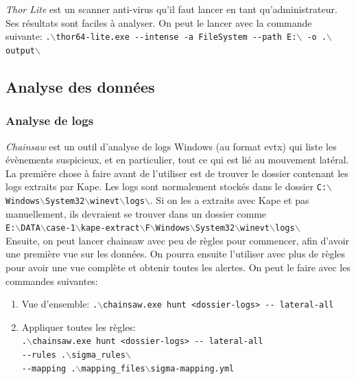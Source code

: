 \textit{Thor Lite} est un scanner anti-virus qu'il faut lancer en tant qu'administrateur. Ses résultats sont faciles à analyser. On peut le lancer avec la commande suivante: \texttt{.$\backslash$thor64-lite.exe -{}-intense -a FileSystem -{}-path E:$\backslash$ -o .$\backslash$output$\backslash$}





\subsection{Analyse des données}



\subsubsection{Analyse de logs}

\textit{Chainsaw} est un outil d'analyse de logs Windows (au format evtx) qui liste les évènements suspicieux, et en particulier, tout ce qui est lié au mouvement latéral. La première chose à faire avant de l'utiliser est de trouver le dossier contenant les logs extraits par Kape. Les logs sont normalement stockés dans le dossier \texttt{C:$\backslash$Windows$\backslash$System32$\backslash$winevt$\backslash$logs$\backslash$}. Si on les a extraits avec Kape et pas manuellement, ils devraient se trouver dans un dossier comme \\
\texttt{E:$\backslash$DATA$\backslash$case-1$\backslash$kape-extract$\backslash$F$\backslash$Windows$\backslash$System32$\backslash$winevt$\backslash$logs$\backslash$} \\
Ensuite, on peut lancer chainsaw avec peu de règles pour commencer, afin d'avoir une première vue sur les données. On pourra ensuite l'utiliser avec plus de règles pour avoir une vue complète et obtenir toutes les alertes. On peut le faire avec les commandes suivantes:

\begin{enumerate}
    \item Vue d'ensemble: \texttt{.$\backslash$chainsaw.exe hunt <dossier-logs> -{}- lateral-all}
    \item Appliquer toutes les règles: \\
    \texttt{.$\backslash$chainsaw.exe hunt <dossier-logs> -{}- lateral-all \\
    -{}-rules .$\backslash$sigma\_rules$\backslash$ \\
    -{}-mapping .$\backslash$mapping\_files$\backslash$sigma-mapping.yml}
\end{enumerate}

